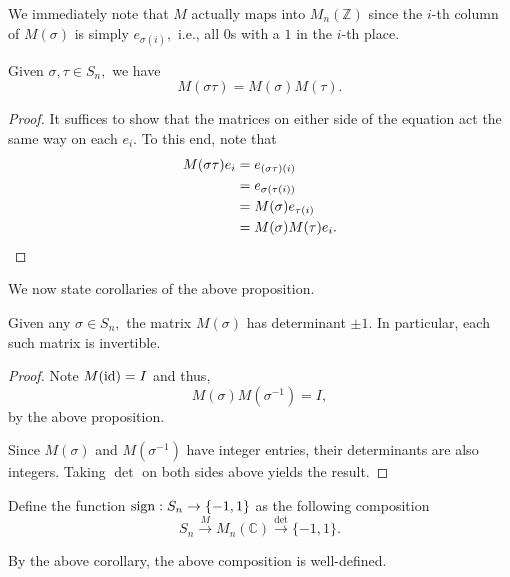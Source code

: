 We immediately note that $M$ actually maps into $M_n(\mathbb{Z})$ since the $i$-th column of $M(\sigma)$ is simply $e_{\sigma(i)},$ i.e., all $0$s with a $1$ in the $i$-th place.

\begin{prop}[$M$ is multiplicative]
	Given $\sigma, \tau \in S_n,$ we have
	\begin{equation*} 
		M(\sigma\tau) = M(\sigma)M(\tau).
	\end{equation*}
\end{prop}
\begin{proof} 
	It suffices to show that the matrices on either side of the equation act the same way on each $e_i.$ To this end, note that
	\begin{align*} 
		M(\sigma\tau)e_i &= e_{(\sigma\tau)(i)}\\
		&= e_{\sigma(\tau(i))}\\
		&= M(\sigma)e_{\tau(i)}\\
		&= M(\sigma)M(\tau)e_i. \qedhere
	\end{align*}
\end{proof}

We now state corollaries of the above proposition.

\begin{cor}
	Given any $\sigma \in S_n,$ the matrix $M(\sigma)$ has determinant $\pm 1.$	In particular, each such matrix is invertible.
\end{cor}
\begin{proof} 
	Note $M(\operatorname{id}) = I$ and thus,
	\begin{equation*} 
		M(\sigma)M(\sigma^{-1}) = I,
	\end{equation*}
	by the above proposition.

	Since $M(\sigma)$ and $M(\sigma^{-1})$ have integer entries, their determinants are also integers. Taking $\det$ on both sides above yields the result.
\end{proof}

\begin{defn} \label{defn:signofperm}
	Define the function $\operatorname{sign}:S_n \to \{-1, 1\}$ as the following composition
	\begin{equation*} 
		S_n \overset{M}{\longrightarrow} M_n(\mathbb{C}) \overset{\det}{\longrightarrow}\{-1, 1\}.
	\end{equation*}
\end{defn}

By the above corollary, the above composition is well-defined.

